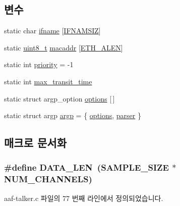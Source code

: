 \subsection*{변수}
\begin{DoxyCompactItemize}
\item 
static char \hyperlink{aaf-talker_8c_ac7b430acaa92a7a26fbcdad47d2efc20}{ifname} \mbox{[}\hyperlink{tl_2openavb__tl__pub_8h_acd06da230a96d3b7e6f193c5b3142002}{I\+F\+N\+A\+M\+S\+IZ}\mbox{]}
\item 
static \hyperlink{stdint_8h_aba7bc1797add20fe3efdf37ced1182c5}{uint8\+\_\+t} \hyperlink{aaf-talker_8c_a951f0a7da0c9d9009218fb069f9d3f2a}{macaddr} \mbox{[}\hyperlink{avb__avtp_8h_a9822d89774e0d6ddaa06503950130423}{E\+T\+H\+\_\+\+A\+L\+EN}\mbox{]}
\item 
static int \hyperlink{aaf-talker_8c_acec9ce2df15222151ad66fcb1d74eb9f}{priority} = -\/1
\item 
static int \hyperlink{aaf-talker_8c_a8755673da5bacdb08ed9d17a8288007e}{max\+\_\+transit\+\_\+time}
\item 
static struct argp\+\_\+option \hyperlink{aaf-talker_8c_abc1fd3a47aea6a8944038c9100eb9135}{options} \mbox{[}$\,$\mbox{]}
\item 
static struct argp \hyperlink{aaf-talker_8c_ab70c96531b1b652d70c221cfaf3207f3}{argp} = \{ \hyperlink{aaf-talker_8c_abc1fd3a47aea6a8944038c9100eb9135}{options}, \hyperlink{aaf-talker_8c_aa4dfc09c5a09d2e347cd355dfdecba57}{parser} \}
\end{DoxyCompactItemize}


\subsection{매크로 문서화}
\subsubsection[{\texorpdfstring{D\+A\+T\+A\+\_\+\+L\+EN}{DATA_LEN}}]{\setlength{\rightskip}{0pt plus 5cm}\#define D\+A\+T\+A\+\_\+\+L\+EN~({\bf S\+A\+M\+P\+L\+E\+\_\+\+S\+I\+ZE} $\ast$ {\bf N\+U\+M\+\_\+\+C\+H\+A\+N\+N\+E\+LS})}\hypertarget{aaf-talker_8c_af02e45f15080b8ec9dd7b286157617ff}{}\label{aaf-talker_8c_af02e45f15080b8ec9dd7b286157617ff}


aaf-\/talker.\+c 파일의 77 번째 라인에서 정의되었습니다.

